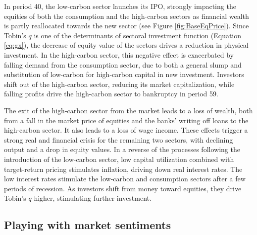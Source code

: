 \documentclass[authoryear]{article}
\begin{document}
In period 40, the low-carbon sector launches its IPO, strongly impacting the equities of both  the consumption and the high-carbon sectors as financial wealth is partly reallocated towards the new sector (see Figure \ref{fig:BaseEqPrice}). Since Tobin's $q$ is one of the determinants of sectoral investment function (Equation \ref{eq:gx}), the decrease of equity value of the sectors drives a reduction in physical investment. In the high-carbon sector, this negative effect is exacerbated by falling demand from the consumption sector, due to both a general slump and substitution of low-carbon for high-carbon capital in new investment. Investors shift out of the high-carbon sector, reducing its market capitalization, while falling profits drive the high-carbon sector to bankruptcy in period 59.

The exit of the high-carbon sector from the market leads to a loss of wealth, both from a fall in the market price of equities and the banks' writing off loans to the high-carbon sector. It also leads to a loss of wage income. These effects trigger a strong real and financial crisis for the remaining two sectors, with declining output and a drop in equity values. In a reverse of the processes following the introduction of the low-carbon sector, low capital utilization combined with target-return pricing stimulates inflation, driving down real interest rates. The low interest rates stimulate the low-carbon and consumption sectors after a few periods of recession. As investors shift from money toward equities, they drive Tobin's $q$ higher, stimulating further investment.

\subsection{Playing with market sentiments}
\label{sec:SensAnal}
\end{document}
